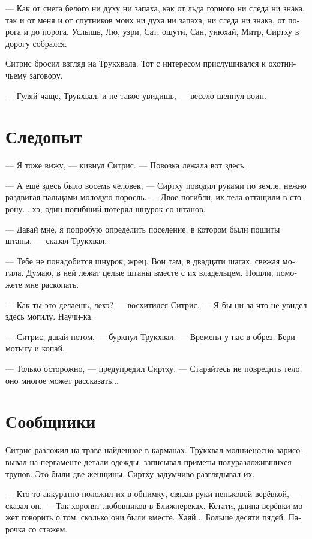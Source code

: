 \documentclass[a4paper,12pt,fleqn]{book}\usepackage{cooltooltips}\usepackage{polyglossia}\setdefaultlanguage{russian}\setotherlanguage{english}\defaultfontfeatures{Ligatures=TeX,Mapping=tex-text} \usepackage{xcolor}\definecolor{lightgray}{HTML}{bbbbbb}\color{lightgray}\newcommand{\ml}[3]{\textenglish{\textcolor{black}{#3}}}
\begin{document}
--- Как от снега белого ни духу ни запаха, как от льда горного ни следа ни знака, так и от меня и от спутников моих ни духа ни запаха, ни следа ни знака, от порога и до порога.
Услышь, Лю, узри, Сат, ощути, Сан, унюхай, Митр, Сиртху в дорогу собрался.

Ситрис бросил взгляд на Трукхвала.
Тот с интересом прислушивался к охотничьему заговору.

--- Гуляй чаще, Трукхвал, и не такое увидишь, --- весело шепнул воин.

\section{Следопыт}

--- Я тоже вижу, --- кивнул Ситрис.
--- Повозка лежала вот здесь.

--- А ещё здесь было восемь человек, --- Сиртху поводил руками по земле, нежно раздвигая пальцами молодую поросль.
--- Двое погибли, их тела оттащили в сторону... хэ, один погибший потерял шнурок со штанов.

--- Давай мне, я попробую определить поселение, в котором были пошиты штаны, --- сказал Трукхвал.

--- Тебе не понадобится шнурок, жрец.
Вон там, в двадцати шагах, свежая могила.
Думаю, в ней лежат целые штаны вместе с их владельцем.
Пошли, поможете мне раскопать.

--- Как ты это делаешь, лехэ? --- восхитился Ситрис.
--- Я бы ни за что не увидел здесь могилу.
Научи-ка.

--- Ситрис, давай потом, --- буркнул Трукхвал.
--- Времени у нас в обрез.
Бери мотыгу и копай.

--- Только осторожно, --- предупредил Сиртху.
--- Старайтесь не повредить тело, оно многое может рассказать...

\section{Сообщники}

Ситрис разложил на траве найденное в карманах.
Трукхвал молниеносно зарисовывал на пергаменте детали одежды, записывал приметы полуразложившихся трупов.
Это были две женщины.
Сиртху задумчиво разглядывал их.

--- Кто-то аккуратно положил их в обнимку, связав руки пеньковой верёвкой, --- сказал он.
--- Так хоронят любовников в Ближнереках.
Кстати, длина верёвки может говорить о том, сколько они были вместе.
Хаяй...
Больше десяти пядей.
Парочка со стажем.
\end{document}
